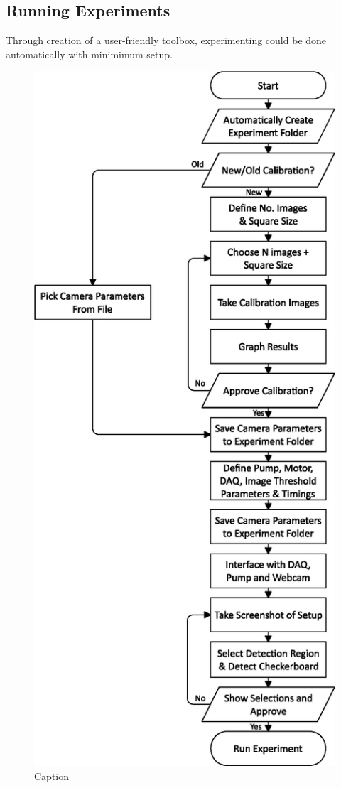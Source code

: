 \documentclass{physics_article_B}
\begin{document}
    
    
    \subsection{Running Experiments}
        Through creation of a user-friendly toolbox, experimenting could be done automatically with minimimum setup.
        
        \begin{figure}
            \centering
            \hspace*{-5.4cm}\includegraphics[scale=0.8]{Figures/FlowSetup.eps}
            \caption{Caption}
            \label{fig:setup:flow}
        \end{figure}
        
\end{document}
